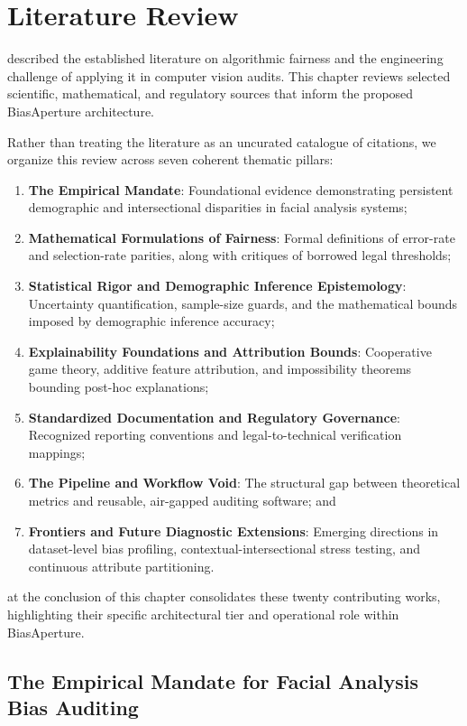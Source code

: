 \chapter{Literature Review}
\label{chap:litreview}

 described the established literature on algorithmic fairness and the engineering challenge of applying it in computer vision audits. This chapter reviews selected scientific, mathematical, and regulatory sources that inform the proposed BiasAperture architecture.

Rather than treating the literature as an uncurated catalogue of citations, we organize this review across seven coherent thematic pillars:
\begin{enumerate}
    \item \textbf{The Empirical Mandate}: Foundational evidence demonstrating persistent demographic and intersectional disparities in facial analysis systems;
    \item \textbf{Mathematical Formulations of Fairness}: Formal definitions of error-rate and selection-rate parities, along with critiques of borrowed legal thresholds;
    \item \textbf{Statistical Rigor and Demographic Inference Epistemology}: Uncertainty quantification, sample-size guards, and the mathematical bounds imposed by demographic inference accuracy;
    \item \textbf{Explainability Foundations and Attribution Bounds}: Cooperative game theory, additive feature attribution, and impossibility theorems bounding post-hoc explanations;
    \item \textbf{Standardized Documentation and Regulatory Governance}: Recognized reporting conventions and legal-to-technical verification mappings;
    \item \textbf{The Pipeline and Workflow Void}: The structural gap between theoretical metrics and reusable, air-gapped auditing software; and
    \item \textbf{Frontiers and Future Diagnostic Extensions}: Emerging directions in dataset-level bias profiling, contextual-intersectional stress testing, and continuous attribute partitioning.
\end{enumerate}

 at the conclusion of this chapter consolidates these twenty contributing works, highlighting their specific architectural tier and operational role within BiasAperture.


\section{The Empirical Mandate for Facial Analysis Bias Auditing}
\label{sec:lit_empirical}


